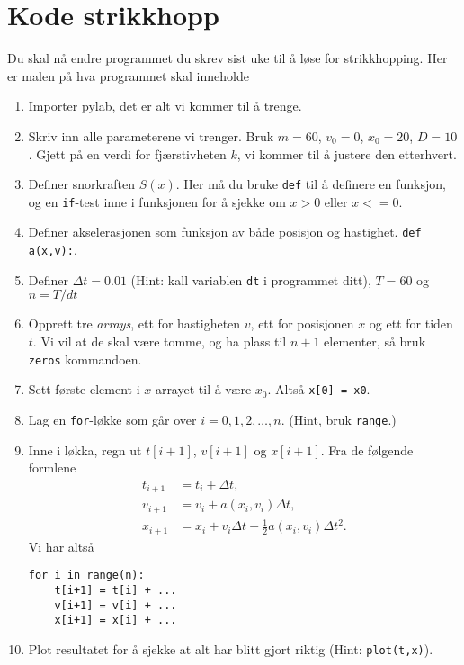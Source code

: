\documentclass[a4paper, 11pt, notitlepage, english]{article}
\begin{document}
\section*{Kode strikkhopp}
Du skal nå endre programmet du skrev sist uke til å løse for strikkhopping. Her er malen på hva programmet skal inneholde
\begin{enumerate}
    \item Importer pylab, det er alt vi kommer til å trenge.
    \item Skriv inn alle parameterene vi trenger. Bruk $m=60$, $v_0=0$, $x_0=20$, $D=10$. Gjett på en verdi for fjærstivheten $k$, vi kommer til å justere den etterhvert.
    \item Definer snorkraften $S(x)$. Her må du bruke \verb+def+ til å definere en funksjon, og en \verb+if+-test inne i funksjonen for å sjekke om $x>0$ eller $x<=0$. 
    \item Definer akselerasjonen som funksjon av både posisjon og hastighet. \verb+def a(x,v):+.
    \item Definer $\Delta t = 0.01$ (Hint: kall variablen \verb+dt+ i programmet ditt), $T=60$ og $n = T/dt$
    \item Opprett tre \emph{arrays}, ett for hastigheten $v$, ett for posisjonen $x$ og ett for tiden $t$. Vi vil at de skal være tomme, og ha plass til $n+1$ elementer, så bruk \verb+zeros+ kommandoen. 
    \item Sett første element i $x$-arrayet til å være $x_0$. Altså \verb+x[0] = x0+.
    \item Lag en \verb+for+-løkke som går over $i=0,1,2,\ldots,n$. (Hint, bruk \verb+range+.)
    \item Inne i løkka, regn ut $t[i+1]$, $v[i+1]$ og $x[i+1]$. Fra de følgende formlene
    \begin{align*}
    t_{i+1} &= t_i + \Delta t, \\
    v_{i+1} &= v_i + a(x_i, v_i)\Delta t, \\
    x_{i+1} &= x_i + v_i\Delta t + \frac{1}{2}a(x_i, v_i)\Delta t^2.
    \end{align*}
    Vi har altså
    \begin{lstlisting}
for i in range(n):
    t[i+1] = t[i] + ...
    v[i+1] = v[i] + ...
    x[i+1] = x[i] + ...    
    \end{lstlisting}
    \item Plot resultatet for å sjekke at alt har blitt gjort riktig (Hint: \verb+plot(t,x)+).
\end{enumerate}
\end{document}
